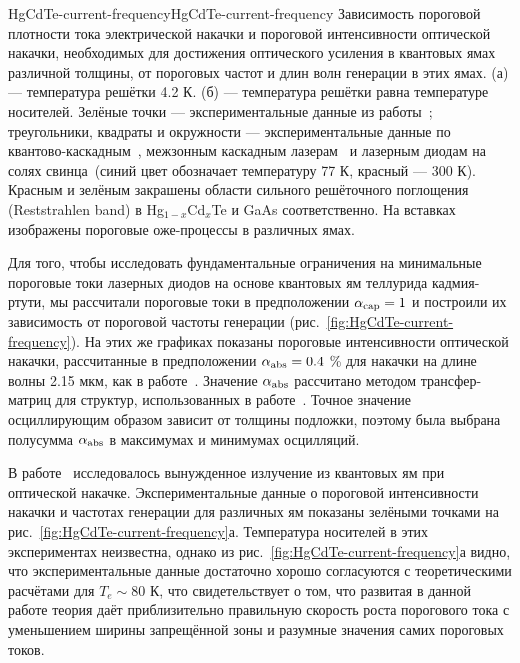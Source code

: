 \begin{fig}{HgCdTe-current-frequency}{HgCdTe-current-frequency} Зависимость пороговой плотности тока электрической накачки и пороговой интенсивности оптической накачки, необходимых для достижения оптического усиления в квантовых ямах \HgCdTe{} различной толщины, от пороговых частот и длин волн генерации в этих ямах. (а) --- температура решётки 4.2 К. (б) --- температура решётки равна температуре носителей. Зелёные точки --- экспериментальные данные из работы~\cite{HgCdTe-stimulated_emission}; треугольники, квадраты и окружности --- экспериментальные данные по квантово-каскадным~\cite{QCL_5.1um_300K,QCL_7.66um_300K,QCL_15.1um_300K,QCL_17.8um_77K,QCL_24.5um_77K}, межзонным каскадным лазерам~\cite{ICL_3.67um_300K,ICL_6um_300K,ICL_7um_300K,ICL_10.4um_77K} и лазерным диодам на солях свинца~\cite{LeadSalt_DoubleHeterostructure,Lead_Salt_LaserCharacteristics}\protect\footnotemark (синий цвет обозначает температуру 77 К, красный --- 300 К). Красным и зелёным закрашены области сильного решёточного поглощения (Reststrahlen band) в Hg$_{1-x}$Cd$_{x}$Te и GaAs соответственно. На вставках изображены пороговые оже-процессы в различных ямах.
\end{fig}

Для того, чтобы исследовать фундаментальные ограничения на минимальные пороговые токи лазерных диодов на основе квантовых ям теллурида кадмия-ртути, мы рассчитали пороговые токи в предположении $\alpha_{\rm cap} = 1$ и построили их зависимость от пороговой частоты генерации (рис.~\ref{fig:HgCdTe-current-frequency}). На этих же графиках показаны пороговые интенсивности оптической накачки, рассчитанные в предположении $\alpha_{\rm abs} = 0.4$ \% для накачки на длине волны 2.15 мкм, как в работе~\cite{HgCdTe-stimulated_emission}. Значение $\alpha_{\rm abs}$ рассчитано методом трансфер-матриц для структур, использованных в работе~\cite{HgCdTe-stimulated_emission}. Точное значение осциллирующим образом зависит от толщины подложки, поэтому была выбрана полусумма $\alpha_{\rm abs}$ в максимумах и минимумах осцилляций.


В работе~\cite{HgCdTe-stimulated_emission} исследовалось вынужденное излучение из квантовых ям \HgCdTe{} при оптической накачке. Экспериментальные данные о пороговой интенсивности накачки и частотах генерации для различных ям показаны зелёными точками на рис.~\ref{fig:HgCdTe-current-frequency}а. Температура носителей в этих экспериментах неизвестна, однако из рис.~\ref{fig:HgCdTe-current-frequency}а видно, что экспериментальные данные достаточно хорошо согласуются с теоретическими расчётами для $T_e \sim 80$ К, что свидетельствует о том, что развитая в данной работе теория даёт приблизительно правильную скорость роста порогового тока с уменьшением ширины запрещённой зоны и разумные значения самих пороговых токов.

